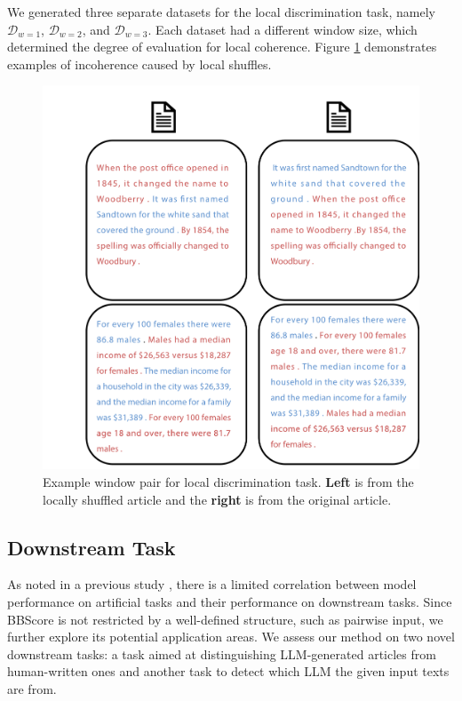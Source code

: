 \documentclass[letterpaper]{article} %
\begin{document}
We generated three separate datasets for the local discrimination task, namely $\mathcal{D}_{w=1}$, $\mathcal{D}_{w=2}$, and $\mathcal{D}_{w=3}$. Each dataset had a different window size, which determined the degree of evaluation for local coherence. Figure \ref{Figure:local_exp} demonstrates examples of incoherence caused by local shuffles.



\begin{figure}[t!]
  \centering
  \includegraphics[width=\linewidth,trim={2.9cm 0 0 3.5cm},clip]{pictures/documents.pdf}
  \caption{Example window pair for local discrimination task. \textbf{Left} is from the locally shuffled article and the \textbf{right} is from the original article.}
  \label{Figure:local_exp}
\end{figure}



\subsection{Downstream Task}\label{exp:down}
As noted in a previous study \citep{mohiuddin-etal-2021-rethinking}, there is a limited correlation between model performance on artificial tasks and their performance on downstream tasks. Since BBScore is not restricted by a well-defined structure, such as pairwise input, we further explore its potential application areas. We assess our method on two novel downstream tasks: a task aimed at distinguishing LLM-generated articles from human-written ones and another task to detect which LLM the given input texts are from.
\end{document}
